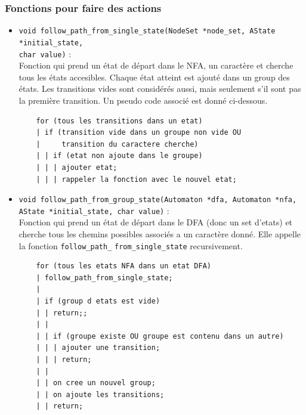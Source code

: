 \documentclass[12pt]{article}
\begin{document}
\subsubsection{Fonctions pour faire des actions}
\begin{itemize}
  \item \lstinline|void follow_path_from_single_state(NodeSet *node_set, AState *initial_state,|\\ 
  \lstinline|char value)| : \\
  Fonction qui prend un état de départ dans le NFA, un caractère et cherche tous les états accesibles. Chaque état atteint est ajouté dans un group des états. Les transitions vides sont considérés aussi, mais seulement s'il sont pas la première transition. Un pseudo code associé est donné ci-dessous.

  \begin{lstlisting}
    for (tous les transitions dans un etat)
    | if (transition vide dans un groupe non vide OU 
    |     transition du caractere cherche) 
    | | if (etat non ajoute dans le groupe) 
    | | | ajouter etat;
    | | | rappeler la fonction avec le nouvel etat;
  \end{lstlisting}

  \item \lstinline|void follow_path_from_group_state(Automaton *dfa, Automaton *nfa,|\\
  \lstinline|AState *initial_state, char value)| : \\
  Fonction qui prend un état de départ dans le DFA (donc un set d'etats) et cherche tous les chemins possibles associés a un caractère donné. Elle appelle la fonction \texttt{follow\_path\_} \texttt{from\_single\_state} recursivement.

  \begin{lstlisting}
    for (tous les etats NFA dans un etat DFA)
    | follow_path_from_single_state;
    |
    | if (group d etats est vide)
    | | return;;
    | | 
    | | if (groupe existe OU groupe est contenu dans un autre) 
    | | | ajouter une transition;
    | | | return;
    | |
    | | on cree un nouvel group;
    | | on ajoute les transitions;
    | | return;
  \end{lstlisting}


\end{itemize}
\end{document}
